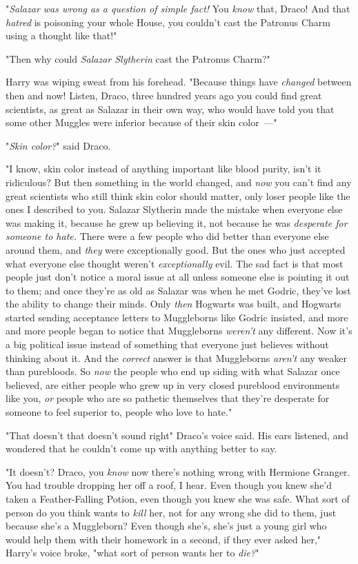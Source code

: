 "\emph{Salazar was wrong as a question of simple fact!} You \emph{know} that,
Draco! And that \emph{hatred} is poisoning your whole House, you couldn't cast
the Patronus Charm using a thought like that!"

"Then why could \emph{Salazar Slytherin} cast the Patronus Charm?"

Harry was wiping sweat from his forehead. "Because things have \emph{changed}
between then and now! Listen, Draco, three hundred years ago you could find
great scientists, as great as Salazar in their own way, who would have told you
that some other Muggles were inferior because of their skin color~---"

"\emph{Skin color?}" said Draco.

"I know, skin color instead of anything important like blood purity, isn't it
ridiculous? But then something in the world changed, and \emph{now} you can't
find any great scientists who still think skin color should matter, only loser
people like the ones I described to you. Salazar Slytherin made the mistake
when everyone else was making it, because he grew up believing it, not because
he was \emph{desperate for someone to hate.} There were a few people who did
better than everyone else around them, and \emph{they} were exceptionally good.
But the ones who just accepted what everyone else thought weren't
\emph{exceptionally} evil. The sad fact is that most people just don't notice a
moral issue at all unless someone else is pointing it out to them; and once
they're as old as Salazar was when he met Godric, they've lost the ability to
change their minds. Only \emph{then} Hogwarts was built, and Hogwarts started
sending acceptance letters to Muggleborns like Godric insisted, and more and
more people began to notice that Muggleborns \emph{weren't} any different. Now
it's a big political issue instead of something that everyone just believes
without thinking about it. And the \emph{correct} answer is that Muggleborns
\emph{aren't} any weaker than purebloods. So \emph{now} the people who end up
siding with what Salazar once believed, are either people who grew up in very
closed pureblood environments like you, \emph{or} people who are so pathetic
themselves that they're desperate for someone to feel superior to, people who
love to hate."

"That doesn't{\el} that doesn't sound right{\el}" Draco's voice said. His
ears listened, and wondered that he couldn't come up with anything better to
say.

"It doesn't? Draco, you \emph{know} now there's nothing wrong with Hermione
Granger. You had trouble dropping her off a roof, I hear. Even though you knew
she'd taken a Feather-Falling Potion, even though you knew she was safe. What
sort of person do you think wants to \emph{kill} her, not for any wrong she did
to them, just because she's a Muggleborn? Even though she's, she's just a young
girl who would help them with their homework in a second, if they ever asked
her," Harry's voice broke, "what sort of person wants her to \emph{die?}"

